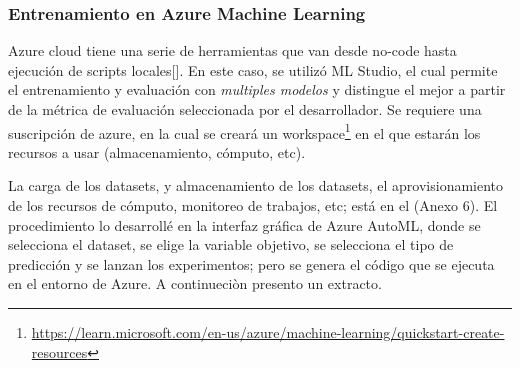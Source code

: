 \subsubsection{Entrenamiento en Azure Machine
Learning}\label{entrenamiento-en-azure-machine-learning}

Azure cloud tiene una serie de herramientas que van desde no-code hasta
ejecución de scripts locales{[}{]}. En este caso, se utilizó ML Studio,
el cual permite el entrenamiento y evaluación con \emph{multiples
modelos} y distingue el mejor a partir de la métrica de evaluación
seleccionada por el desarrollador. Se requiere una suscripción de azure,
en la cual se creará un workspace\footnote{\url{https://learn.microsoft.com/en-us/azure/machine-learning/quickstart-create-resources}}
en el que estarán los recursos a usar (almacenamiento, cómputo, etc).

La carga de los datasets, y almacenamiento de los datasets, el
aprovisionamiento de los recursos de cómputo, monitoreo de trabajos,
etc; está en el (Anexo 6). El procedimiento lo desarrollé en la interfaz
gráfica de Azure AutoML, donde se selecciona el dataset, se elige la
variable objetivo, se selecciona el tipo de predicción y se lanzan los
experimentos; pero se genera el código que se ejecuta en el entorno de
Azure. A continueciòn presento un extracto.

